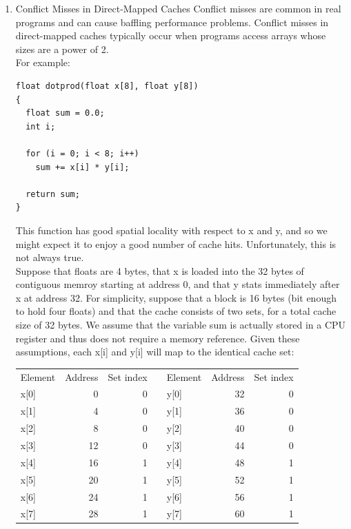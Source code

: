 \documentclass[11pt]{article}
\begin{document}
\begin{enumerate}
\item Conflict Misses in Direct-Mapped Caches
\label{sec:orgbbbe943}
Conflict misses are common in real programs and can cause baffling performance problems. Conflict misses in direct-mapped caches typically occur when programs access arrays whose sizes are a power of 2.\\

For example:\\
\begin{verbatim}
float dotprod(float x[8], float y[8])
{
  float sum = 0.0;
  int i;

  for (i = 0; i < 8; i++)
    sum += x[i] * y[i];

  return sum;
}

\end{verbatim}

This function has good spatial locality with respect to x and y, and so we might expect it to enjoy a good number of cache hits. Unfortunately, this is not always true.\\

Suppose that floats are 4 bytes, that x is loaded into the 32 bytes of contiguous memroy starting at address 0, and that y stats immediately after x at address 32. For simplicity, suppose that a block is 16 bytes (bit enough to hold four floats) and that the cache consists of two sets, for a total cache size of 32 bytes. We assume that the variable sum is actually stored in a CPU register and thus does not require a memory reference. Given these assumptions, each x[i] and y[i] will map to the identical cache set:\\

\begin{center}
\begin{tabular}{lrrllrr}
Element & Address & Set index &  & Element & Address & Set index\\
x[0] & 0 & 0 &  & y[0] & 32 & 0\\
x[1] & 4 & 0 &  & y[1] & 36 & 0\\
x[2] & 8 & 0 &  & y[2] & 40 & 0\\
x[3] & 12 & 0 &  & y[3] & 44 & 0\\
x[4] & 16 & 1 &  & y[4] & 48 & 1\\
x[5] & 20 & 1 &  & y[5] & 52 & 1\\
x[6] & 24 & 1 &  & y[6] & 56 & 1\\
x[7] & 28 & 1 &  & y[7] & 60 & 1\\
\end{tabular}
\end{center}


\end{enumerate}
\end{document}
